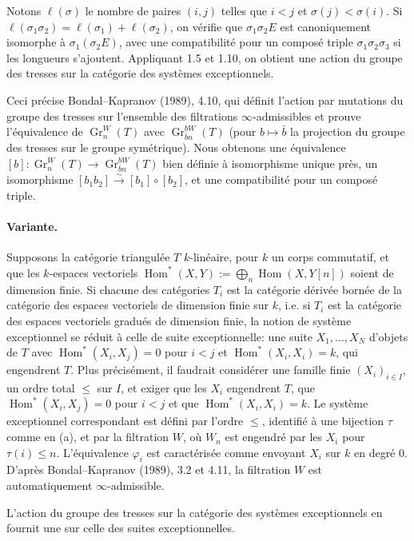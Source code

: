 \documentclass[11pt]{article}
\newcommand{\Hom}{\operatorname{Hom}}
\newcommand{\Gr}{\operatorname{Gr}}
\begin{document}
Notons $\ell(\sigma)$ le nombre de paires $(i,j)$ telles que $i<j$ et $\sigma(j)<\sigma(i)$. Si $\ell(\sigma_1\sigma_2)=\ell(\sigma_1)+\ell(\sigma_2)$, on vérifie que $\sigma_1\sigma_2E$ est canoniquement isomorphe à $\sigma_1(\sigma_2E)$, avec une compatibilité pour un composé triple $\sigma_1\sigma_2\sigma_3$ si les longueurs s'ajoutent. Appliquant 1.5 et 1.10, on obtient une action du groupe des tresses sur la catégorie des systèmes exceptionnels.

Ceci précise Bondal--Kapranov (1989), 4.10, qui définit l'action par mutations du groupe des tresses sur l'ensemble des filtrations $\infty$-admissibles et prouve l'équivalence de $\Gr^W_n(T)$ avec $\Gr^{bW}_{\bar b n}(T)$ (pour $b\mapsto\bar b$ la projection du groupe des tresses sur le groupe symétrique). Nous obtenons une équivalence $[b]:\Gr^W_n(T)\to\Gr^{bW}_{\bar b n}(T)$ bien définie à isomorphisme unique près, un isomorphisme $[b_1b_2]\xrightarrow{\sim}[b_1]\circ[b_2]$, et une compatibilité pour un composé triple.

\paragraph{Variante.} Supposons la catégorie triangulée $T$ $k$-linéaire, pour $k$ un corps commutatif, et que les $k$-espaces vectoriels $\Hom^*(X,Y):=\bigoplus_n\Hom(X,Y[n])$ soient de dimension finie. Si chacune des catégories $T_i$ est la catégorie dérivée bornée de la catégorie des espaces vectoriels de dimension finie sur $k$, i.e. si $T_i$ est la catégorie des espaces vectoriels gradués de dimension finie, la notion de système exceptionnel se réduit à celle de suite exceptionnelle: une suite $X_1,\ldots,X_N$ d'objets de $T$ avec $\Hom^*(X_i,X_j)=0$ pour $i<j$ et $\Hom^*(X_i,X_i)=k$, qui engendrent $T$. Plus précisément, il faudrait considérer une famille finie $(X_i)_{i\in I}$, un ordre total $\leq$ sur $I$, et exiger que les $X_i$ engendrent $T$, que $\Hom^*(X_i,X_j)=0$ pour $i<j$ et que $\Hom^*(X_i,X_i)=k$. Le système exceptionnel correspondant est défini par l'ordre $\leq$, identifié à une bijection $\tau$ comme en (a), et par la filtration $W$, où $W_n$ est engendré par les $X_i$ pour $\tau(i)\leq n$. L'équivalence $\varphi_i$ est caractérisée comme envoyant $X_i$ sur $k$ en degré $0$. D'après Bondal--Kapranov (1989), 3.2 et 4.11, la filtration $W$ est automatiquement $\infty$-admissible.

L'action du groupe des tresses sur la catégorie des systèmes exceptionnels en fournit une sur celle des suites exceptionnelles.
\end{document}
